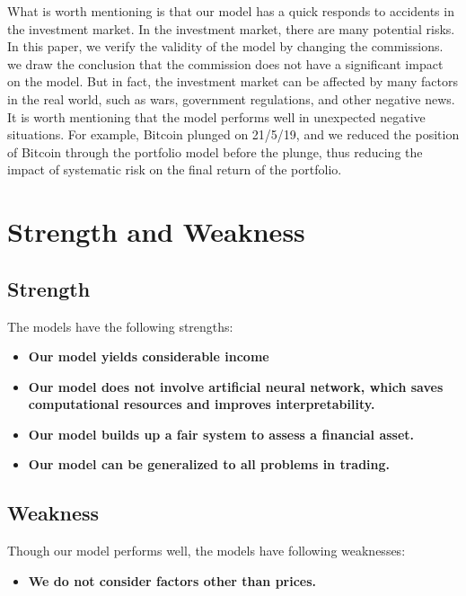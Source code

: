 \documentclass[12pt,a4paper]{article}
\begin{document}
\begin{spacing}{1.2}
What is worth mentioning is that our model has a quick responds to accidents in the investment market. In the investment market, there are many potential risks. In this paper, we verify the validity of the model by changing the commissions. we draw the conclusion that the commission does not have a significant impact on the model.
But in fact, the investment market can be affected by many factors in the real world, such as wars, government regulations, and other negative news. It is worth mentioning that the model performs well in unexpected negative situations. For example, Bitcoin plunged on 21/5/19, and we reduced the position of Bitcoin through the portfolio model before the plunge, thus reducing the impact of systematic risk on the final return of the portfolio.

\section{Strength and Weakness}
\label{Strength_Weakness}


\subsection{Strength}

The models have the following strengths:

\begin{itemize}
\item \textbf{Our model yields considerable income}

\item \textbf{Our model does not involve artificial neural network, which saves computational resources and improves interpretability.}

\item \textbf{Our model builds up a fair system to assess a financial asset.}

\item \textbf{Our model can be generalized to all problems in trading.}

\end{itemize}


\subsection{Weakness}

Though our model performs well, the models have following weaknesses:

\begin{itemize}
\item \textbf{We do not consider factors other than prices.}


\end{itemize}
\end{spacing}
\end{document}
